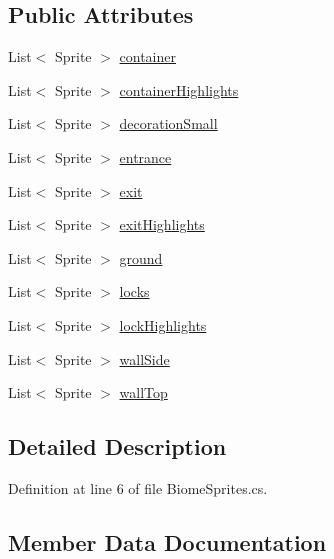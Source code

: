 \subsection*{Public Attributes}
\begin{DoxyCompactItemize}
\item 
List$<$ Sprite $>$ \mbox{\hyperlink{class_biome_sprites_a8fb08a6b474e7f7e8a40daf20a463de4}{container}}
\item 
List$<$ Sprite $>$ \mbox{\hyperlink{class_biome_sprites_a33ba33f3c0d2dac517d0e883d4763e13}{container\+Highlights}}
\item 
List$<$ Sprite $>$ \mbox{\hyperlink{class_biome_sprites_af23ad2a951ba13ed24370a3fe003bfa0}{decoration\+Small}}
\item 
List$<$ Sprite $>$ \mbox{\hyperlink{class_biome_sprites_a28d07a7a7f5e0d8218f82adec2420b94}{entrance}}
\item 
List$<$ Sprite $>$ \mbox{\hyperlink{class_biome_sprites_ae504f59a35b8bb0f6147a2ca926f1c25}{exit}}
\item 
List$<$ Sprite $>$ \mbox{\hyperlink{class_biome_sprites_a6bd7dcfd227829a0d67359dd4e67d666}{exit\+Highlights}}
\item 
List$<$ Sprite $>$ \mbox{\hyperlink{class_biome_sprites_ad2325cb250ec73430e73738fb4da15f9}{ground}}
\item 
List$<$ Sprite $>$ \mbox{\hyperlink{class_biome_sprites_a9965a03afe286f1989281b3ccc3c6d51}{locks}}
\item 
List$<$ Sprite $>$ \mbox{\hyperlink{class_biome_sprites_a9afc6cf26fcf8ef18ee0ad3bfa95c000}{lock\+Highlights}}
\item 
List$<$ Sprite $>$ \mbox{\hyperlink{class_biome_sprites_ae50f2ead3749017429753f14a0acf8ff}{wall\+Side}}
\item 
List$<$ Sprite $>$ \mbox{\hyperlink{class_biome_sprites_a4653b5307c630bec66c3b4c14f8d54f0}{wall\+Top}}
\end{DoxyCompactItemize}


\subsection{Detailed Description}


Definition at line 6 of file Biome\+Sprites.\+cs.



\subsection{Member Data Documentation}
\mbox{\label{class_biome_sprites_a8fb08a6b474e7f7e8a40daf20a463de4}} 
